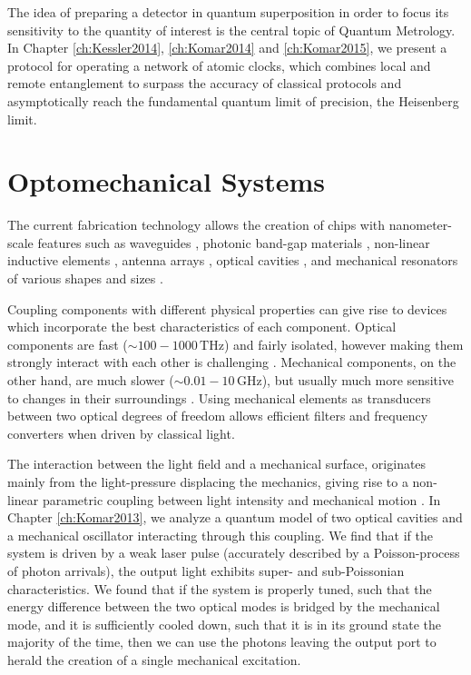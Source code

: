 The idea of preparing a detector in quantum
superposition in order to focus its sensitivity to the quantity of interest is
the central topic of Quantum Metrology. In Chapter \ref{ch:Kessler2014},
\ref{ch:Komar2014} and \ref{ch:Komar2015}, we present a
protocol for operating a network of atomic clocks, which combines local and
remote entanglement to surpass the accuracy of classical protocols and
asymptotically reach the fundamental quantum limit of precision, the Heisenberg limit. 


 
 
 
 
 
 
\section{Optomechanical Systems}
The current fabrication technology allows the creation of chips with
nanometer-scale features such as waveguides \cite{Mekis1996}, photonic band-gap
materials \cite{Foresi1997}, non-linear inductive elements \cite{Makhlin1999},
antenna arrays \cite{Yu2014}, optical cavities \cite{Painter2001}, and
mechanical resonators of various shapes and sizes \cite{Aspelmeyer2014}.

Coupling components with different physical properties can give rise to devices
which incorporate the best characteristics of each component.
Optical components are fast ($\sim 100-1000\,\mathrm{THz}$) and fairly isolated,
however making them strongly interact with each other is challenging
\cite{Chang2007}.
Mechanical components, on the other hand, are much slower ($\sim
0.01-10\,\mathrm{GHz}$), but usually much more sensitive to changes in their
surroundings \cite{Aspelmeyer2014}. Using mechanical elements as transducers
between two optical degrees of freedom allows efficient filters and frequency
converters \cite{Eichenfield2009} when driven by classical light.

The interaction between the light field and a mechanical surface, originates
mainly from the light-pressure displacing the mechanics, giving rise to a
non-linear parametric coupling between light intensity and mechanical motion
\cite{Meystre2013}. In Chapter \ref{ch:Komar2013}, we analyze a quantum model of
two optical cavities and a mechanical oscillator interacting through this
coupling. We find that if the system is driven by a weak laser pulse (accurately
described by a Poisson-process of photon arrivals), the output light exhibits
super- and sub-Poissonian characteristics.
We found that if the system is properly tuned, such that the energy difference
between the two optical modes is bridged by the mechanical mode, and it is
sufficiently cooled down, such that it is in its ground state the majority of
the time, then we can use the photons leaving the output port to herald the
creation of a single mechanical excitation.

